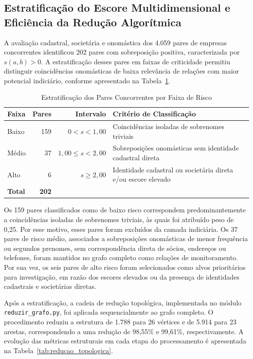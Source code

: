 \subsection{Estratificação do Escore Multidimensional e Eficiência da Redução Algorítmica}

A avaliação cadastral, societária e onomástica dos 4.059 pares de empresas concorrentes identificou 202 pares com sobreposição
positiva, caracterizada por $s(a,b)>0$. A estratificação desses pares em faixas de criticidade permitiu distinguir coincidências
onomásticas de baixa relevância de relações com maior potencial indiciário, conforme apresentado na Tabela~\ref{tab:estratificacao}.
\begin{table}[!h]
  \centering
  \caption{Estratificação dos Pares Concorrentes por Faixa de Risco}
  \label{tab:estratificacao}
  \footnotesize
  \begin{tabular}{lrrp{3.2cm}}
    \hline
    \textbf{Faixa} & \textbf{Pares} & \textbf{Intervalo} & \textbf{Critério de Classificação} \\
    \hline
    Baixo & 159 & $0 < s < 1{,}00$ & Coincidências isoladas de sobrenomes triviais \\
    Médio & 37  & $1{,}00 \leq s < 2{,}00$ & Sobreposições onomásticas sem identidade cadastral direta \\
    Alto  & 6   & $s \geq 2{,}00$ & Identidade cadastral ou societária direta e/ou escore elevado \\
    \hline
    \textbf{Total} & \textbf{202} & & \\
    \hline
  \end{tabular}
\end{table}

Os 159 pares classificados como de baixo risco correspondem predominantemente a coincidências isoladas de sobrenomes
triviais, às quais foi atribuído peso de 0{,}25. Por esse motivo, esses pares foram excluídos da camada indiciária. Os 37 pares
de risco médio, associados a sobreposições onomásticas de menor frequência ou segundos prenomes, sem correspondência direta de
sócios, endereços ou telefones, foram mantidos no grafo completo como relações de monitoramento. Por sua vez, os seis pares de
alto risco foram selecionados como alvos prioritários para investigação, em razão dos escores elevados ou da presença de
identidades cadastrais e societárias diretas.

Após a estratificação, a cadeia de redução topológica, implementada no módulo \texttt{reduzir\_grafo.py}, foi aplicada
sequencialmente ao grafo completo. O procedimento reduziu a estrutura de 1.788 para 26 vértices e de 5.914 para 23 arestas,
correspondendo a uma redução de 98{,}55\% e 99{,}61\%, respectivamente. A evolução das métricas estruturais em cada
etapa do processamento é apresentada na Tabela~\ref{tab:reducao_topologica}.

